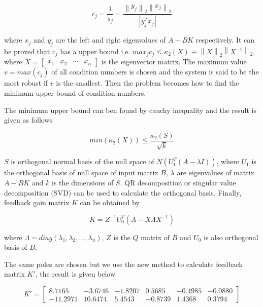 \documentclass[hyperref]{article}
\theoremstyle{nonumberplain}
\begin{document}
	\begin{equation}
	c_{j}=\frac{1}{s_{j}}=\frac{\left \| y_{j} \right \|_{2} \left \| x_{j} \right \|_{2}}{\left |y_{j}^{T} x_{j}  \right |}
	\label{eq16}
	\end{equation}
	
	where $x_{j}$ and $y_{j}$ are the left and right eigenvalues of $A-BK$ respectively. It can be proved that $c_{j}$ has a upper bound i.e. $max_{j}c_{j} \leq \kappa _{2}(X)\equiv \left \| X \right \|_{2}\left \| X^{-1} \right \|_{2}$, where $X=\begin{bmatrix}
	x_{1} &x_{2}  &\cdots   & x_{n}
	\end{bmatrix}$ is the eigenvector matrix. The maximum value $v=max(c_{j})$ of all condition numbers is chosen and the system is said to be the most robust if $v$ is the smallest. Then the problem becomes how to find the minimum upper bound of condition numbers.
	
	The minimum upper bound can ben found by cauchy inequality and the result is given as follows
	
	\begin{equation}
	min ( \kappa _{2}(X)) \leq \frac{\kappa _{2}(S)}{\sqrt{k}}
	\label{eq17}
	\end{equation}
	
	$S$ is orthogonal normal basis of the null space of $N(U_{1}^{T}(A-\lambda I))$, where $U_{1}$ is the orthogonal basis of null space of input matrix $B$, $\lambda$ are eigenvalues of matrix $A-BK$ and $k$ is the dimensions of $S$. QR decomposition or singular value decomposition (SVD) can be used to calculate the orthogonal basis. Finally, feedback gain matrix $K$ can be obtained by
	
	\begin{equation}
	K=Z^{-1}U_{0}^{T}(A-X\Lambda X^{-1})
	\label{eq18}
	\end{equation}
	
	where $\Lambda=diag(\lambda_{1},\lambda_{2},...,\lambda_{n})$, $Z$ is the $Q$ matrix of $B$ and $U_{0}$ is also orthogonal basis of $B$.
	
	The same poles are chosen but we use the new method to calculate feedback matrix ${K}'$, the result is given below
	
	\begin{equation}
	{K}'=\begin{bmatrix}
	8.7165 &-3.6746  &-1.8207  &0.5685  &-0.4985  &-0.0880 \\ 
	-11.2971 &10.6474  &5.4543  &-0.8739  &1.4368  &0.3794 
	\end{bmatrix}
	\nonumber
	\end{equation}
	
\end{document}
